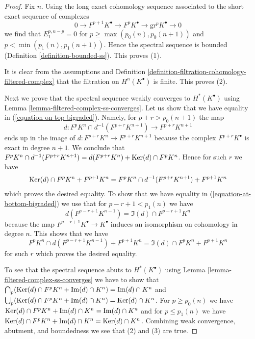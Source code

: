 \begin{proof}
Fix $n$. Using the long exact cohomology sequence associated to
the short exact sequence of complexes
$$
0 \to F^{p + 1}K^\bullet \to F^pK^\bullet \to \text{gr}^pK^\bullet \to 0
$$
we find that $E_1^{p, n - p} = 0$ for $p \geq \max(p_0(n), p_0(n + 1))$ and
$p < \min(p_1(n), p_1(n + 1))$. Hence the spectral sequence is bounded
(Definition \ref{definition-bounded-ss}). This proves (1).

\medskip\noindent
It is clear from the assumptions and
Definition \ref{definition-filtration-cohomology-filtered-complex}
that the filtration on $H^n(K^\bullet)$ is finite. This proves (2).

\medskip\noindent
Next we prove that the spectral sequence weakly converges to
$H^*(K^\bullet)$ using
Lemma \ref{lemma-filtered-complex-ss-converges}.
Let us show that we have equality in (\ref{equation-on-top-bigraded}).
Namely, for $p + r > p_0(n + 1)$ the map
$$
d : F^pK^{n} \cap d^{-1}(F^{p + r}K^{n + 1}) \to F^{p + r}K^{n + 1}
$$
ends up in the image of $d : F^{p + r}K^n \to F^{p + r}K^{n + 1}$
because the complex $F^{p + r}K^\bullet$ is exact in degree $n + 1$.
We conclude that $F^pK^{n} \cap d^{-1}(F^{p + r}K^{n + 1}) =
d(F^{p + r}K^n) + \mathop{\mathrm{Ker}}(d) \cap F^pK^n$. Hence for such $r$ we have
$$
\mathop{\mathrm{Ker}}(d) \cap F^pK^{n} + F^{p + 1}K^{n} =
F^pK^{n} \cap d^{-1}(F^{p + r}K^{n + 1}) + F^{p + 1}K^{n}
$$
which proves the desired equality. To show that we have equality in
(\ref{equation-at-bottom-bigraded}) we use that for $p - r + 1 < p_1(n)$
we have
$$
d(F^{p - r + 1}K^{n - 1}) = \Im(d) \cap F^{p - r + 1}K^n
$$
because the map $F^{p - r + 1}K^\bullet \to K^\bullet$ induces an
isomorphism on cohomology in degree $n$. This shows that
we have
$$
F^pK^{n} \cap d(F^{p - r + 1}K^{n - 1}) + F^{p + 1}K^{n} =
\Im(d) \cap F^pK^{n} + F^{p + 1}K^{n}
$$
for such $r$ which proves the desired equality.

\medskip\noindent
To see that the spectral sequence abuts to $H^*(K^\bullet)$ using
Lemma \ref{lemma-filtered-complex-ss-converges} we have to show that
$\bigcap_p (\mathop{\mathrm{Ker}}(d) \cap F^pK^n + \mathop{\mathrm{Im}}(d) \cap K^n) = \mathop{\mathrm{Im}}(d) \cap K^n$
and
$\bigcup_p (\mathop{\mathrm{Ker}}(d) \cap F^pK^n + \mathop{\mathrm{Im}}(d) \cap K^n) = \mathop{\mathrm{Ker}}(d) \cap K^n$.
For $p \geq p_0(n)$ we have
$\mathop{\mathrm{Ker}}(d) \cap F^pK^n + \mathop{\mathrm{Im}}(d) \cap K^n = \mathop{\mathrm{Im}}(d) \cap K^n$
and for $p \leq p_1(n)$ we have
$\mathop{\mathrm{Ker}}(d) \cap F^pK^n + \mathop{\mathrm{Im}}(d) \cap K^n = \mathop{\mathrm{Ker}}(d) \cap K^n$.
Combining weak convergence, abutment, and boundedness we see
that (2) and (3) are true.
\end{proof}























